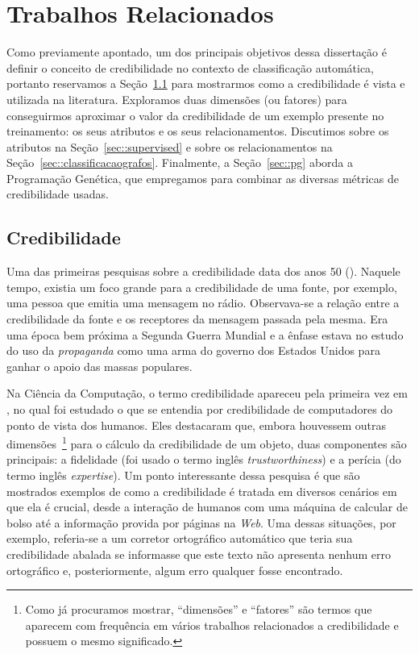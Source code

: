 
\chapter{Trabalhos Relacionados}
\label{cap::related}

Como previamente apontado, um dos principais objetivos dessa dissertação é definir o conceito de credibilidade no contexto de classificação automática, portanto reservamos a 
Seção~\ref{sec::credibilidade} para mostrarmos como a credibilidade é vista e utilizada na literatura.
Exploramos duas dimensões (ou fatores) para conseguirmos aproximar o valor da credibilidade de um exemplo presente no treinamento: os seus atributos e os seus relacionamentos.
Discutimos sobre os atributos na Seção~\ref{sec::supervised} e sobre os relacionamentos na Seção~\ref{sec::classificacaografos}.
Finalmente, a Seção~\ref{sec::pg} aborda a Programação Genética, que empregamos para combinar as diversas métricas de credibilidade usadas. 


\section{Credibilidade}
\label{sec::credibilidade}

Uma das primeiras pesquisas sobre a credibilidade data dos anos 50 (\cite{Hovland51}). Naquele tempo, existia um foco grande para a credibilidade de uma fonte, por exemplo, uma pessoa que emitia uma mensagem no rádio. Observava-se a relação entre a credibilidade da fonte e os receptores da mensagem passada pela mesma. Era uma época bem próxima a Segunda Guerra Mundial e a ênfase estava no estudo do uso da \textit{propaganda} como uma arma do governo dos Estados Unidos para ganhar o apoio das massas populares.

Na Ciência da Computação, o termo credibilidade apareceu pela primeira vez em \cite{Tseng99}, no qual foi estudado o 
que se entendia por credibilidade de computadores do ponto de vista dos humanos.
Eles destacaram que, embora houvessem outras dimensões~\footnote{Como já procuramos mostrar, ``dimensões'' e ``fatores'' são termos que aparecem com frequência em vários trabalhos relacionados a credibilidade e possuem o mesmo significado.} para o cálculo da credibilidade de um objeto, duas componentes são principais: a fidelidade (foi usado o termo inglês \textit{trustworthiness}) e a perícia (do termo inglês \textit{expertise}).
Um ponto interessante dessa pesquisa é que são mostrados exemplos de como a credibilidade é tratada em diversos cenários em que ela é crucial, desde a interação de humanos com uma máquina de calcular de bolso até a informação provida por páginas na \textit{Web}.
Uma dessas situações, por exemplo, referia-se a um corretor ortográfico automático que teria sua credibilidade abalada se informasse que este texto não apresenta nenhum erro ortográfico e, posteriormente, algum erro qualquer fosse encontrado.

